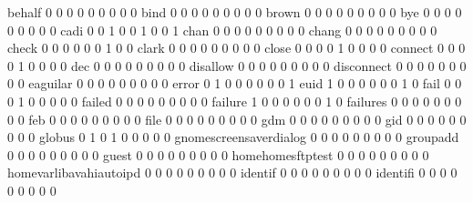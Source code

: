 \documentclass[compress,8pt]{beamer}
\begin{document}
\begin{frame}
\begin{Schunk}
  behalf                                     0   0   0   0   0   0   0   0   0
  bind                                       0   0   0   0   0   0   0   0   0
  brown                                      0   0   0   0   0   0   0   0   0
  bye                                        0   0   0   0   0   0   0   0   0
  cadi                                       0   0   1   0   0   1   0   0   1
  chan                                       0   0   0   0   0   0   0   0   0
  chang                                      0   0   0   0   0   0   0   0   0
  check                                      0   0   0   0   0   0   1   0   0
  clark                                      0   0   0   0   0   0   0   0   0
  close                                      0   0   0   0   1   0   0   0   0
  connect                                    0   0   0   0   1   0   0   0   0
  dec                                        0   0   0   0   0   0   0   0   0
  disallow                                   0   0   0   0   0   0   0   0   0
  disconnect                                 0   0   0   0   0   0   0   0   0
  eaguilar                                   0   0   0   0   0   0   0   0   0
  error                                      0   1   0   0   0   0   0   0   1
  euid                                       1   0   0   0   0   0   0   1   0
  fail                                       0   0   0   1   0   0   0   0   0
  failed                                     0   0   0   0   0   0   0   0   0
  failure                                    1   0   0   0   0   0   0   1   0
  failures                                   0   0   0   0   0   0   0   0   0
  feb                                        0   0   0   0   0   0   0   0   0
  file                                       0   0   0   0   0   0   0   0   0
  gdm                                        0   0   0   0   0   0   0   0   0
  gid                                        0   0   0   0   0   0   0   0   0
  globus                                     0   1   0   1   0   0   0   0   0
  gnomescreensaverdialog                     0   0   0   0   0   0   0   0   0
  groupadd                                   0   0   0   0   0   0   0   0   0
  guest                                      0   0   0   0   0   0   0   0   0
  homehomesftptest                           0   0   0   0   0   0   0   0   0
  homevarlibavahiautoipd                     0   0   0   0   0   0   0   0   0
  identif                                    0   0   0   0   0   0   0   0   0
  identifi                                   0   0   0   0   0   0   0   0   0

\end{Schunk}
\end{frame}
\end{document}
